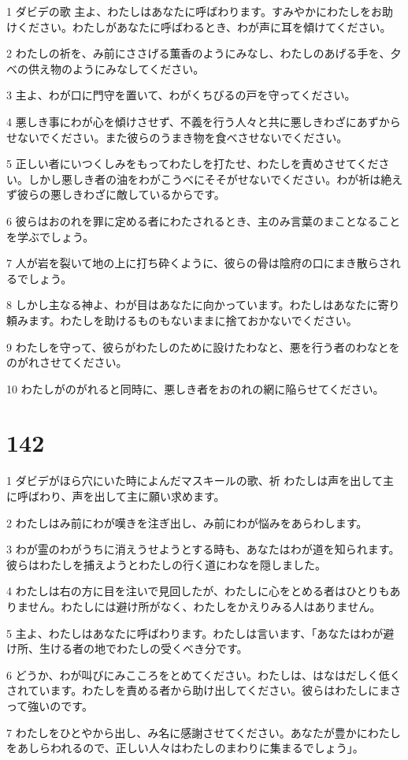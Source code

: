 \par 1 ダビデの歌 主よ、わたしはあなたに呼ばわります。すみやかにわたしをお助けください。わたしがあなたに呼ばわるとき、わが声に耳を傾けてください。
\par 2 わたしの祈を、み前にささげる薫香のようにみなし、わたしのあげる手を、夕べの供え物のようにみなしてください。
\par 3 主よ、わが口に門守を置いて、わがくちびるの戸を守ってください。
\par 4 悪しき事にわが心を傾けさせず、不義を行う人々と共に悪しきわざにあずからせないでください。また彼らのうまき物を食べさせないでください。
\par 5 正しい者にいつくしみをもってわたしを打たせ、わたしを責めさせてください。しかし悪しき者の油をわがこうべにそそがせないでください。わが祈は絶えず彼らの悪しきわざに敵しているからです。
\par 6 彼らはおのれを罪に定める者にわたされるとき、主のみ言葉のまことなることを学ぶでしょう。
\par 7 人が岩を裂いて地の上に打ち砕くように、彼らの骨は陰府の口にまき散らされるでしょう。
\par 8 しかし主なる神よ、わが目はあなたに向かっています。わたしはあなたに寄り頼みます。わたしを助けるものもないままに捨ておかないでください。
\par 9 わたしを守って、彼らがわたしのために設けたわなと、悪を行う者のわなとをのがれさせてください。
\par 10 わたしがのがれると同時に、悪しき者をおのれの網に陥らせてください。

\chapter{142}

\par 1 ダビデがほら穴にいた時によんだマスキールの歌、祈 わたしは声を出して主に呼ばわり、声を出して主に願い求めます。
\par 2 わたしはみ前にわが嘆きを注ぎ出し、み前にわが悩みをあらわします。
\par 3 わが霊のわがうちに消えうせようとする時も、あなたはわが道を知られます。彼らはわたしを捕えようとわたしの行く道にわなを隠しました。
\par 4 わたしは右の方に目を注いで見回したが、わたしに心をとめる者はひとりもありません。わたしには避け所がなく、わたしをかえりみる人はありません。
\par 5 主よ、わたしはあなたに呼ばわります。わたしは言います、「あなたはわが避け所、生ける者の地でわたしの受くべき分です。
\par 6 どうか、わが叫びにみこころをとめてください。わたしは、はなはだしく低くされています。わたしを責める者から助け出してください。彼らはわたしにまさって強いのです。
\par 7 わたしをひとやから出し、み名に感謝させてください。あなたが豊かにわたしをあしらわれるので、正しい人々はわたしのまわりに集まるでしょう」。

